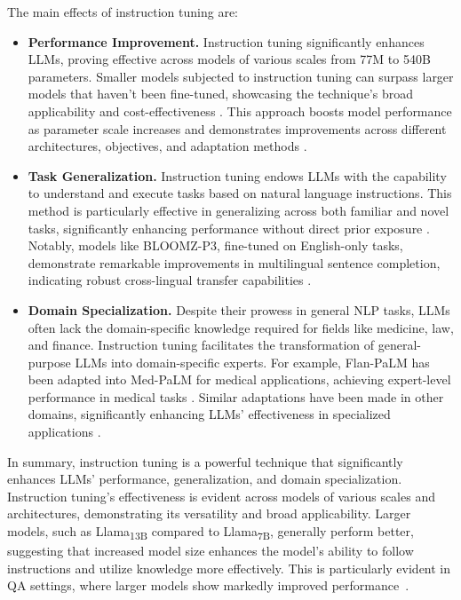 The main effects of instruction tuning are:
\begin{itemize}
	\item \textbf{Performance Improvement.} {
		      Instruction tuning significantly enhances LLMs, proving effective across models of various scales from 77M to 540B parameters. Smaller models subjected to instruction tuning can surpass larger models that haven't been fine-tuned, showcasing the technique's broad applicability and cost-effectiveness \cite{tamkin2021understanding, wei2022fine}. This approach boosts model performance as parameter scale increases and demonstrates improvements across different architectures, objectives, and adaptation methods \cite{raffel2023exploring}.
	      }
	\item \textbf{Task Generalization.} {
		      Instruction tuning endows LLMs with the capability to understand and execute tasks based on natural language instructions. This method is particularly effective in generalizing across both familiar and novel tasks, significantly enhancing performance without direct prior exposure \cite{chowdhery2022palm, tamkin2021understanding}. Notably, models like BLOOMZ-P3, fine-tuned on English-only tasks, demonstrate remarkable improvements in multilingual sentence completion, indicating robust cross-lingual transfer capabilities \cite{chowdhery2022palm}.
	      }
	\item \textbf{Domain Specialization.} {
		      Despite their prowess in general NLP tasks, LLMs often lack the domain-specific knowledge required for fields like medicine, law, and finance. Instruction tuning facilitates the transformation of general-purpose LLMs into domain-specific experts. For example, Flan-PaLM has been adapted into Med-PaLM for medical applications, achieving expert-level performance in medical tasks \cite{raffel2023exploring}. Similar adaptations have been made in other domains, significantly enhancing LLMs' effectiveness in specialized applications \cite{wei2022fine}.
	      }
\end{itemize}

In summary, instruction tuning is a powerful technique that significantly enhances LLMs' performance, generalization, and domain specialization.
Instruction tuning's effectiveness is evident across models of various scales and architectures, demonstrating its versatility and broad applicability.
Larger models, such as Llama\textsubscript{13B} compared to Llama\textsubscript{7B}, generally perform better, suggesting that increased model size enhances the model's ability to follow instructions and utilize knowledge more effectively.
This is particularly evident in QA settings, where larger models show markedly improved performance~\cite{survey}.

